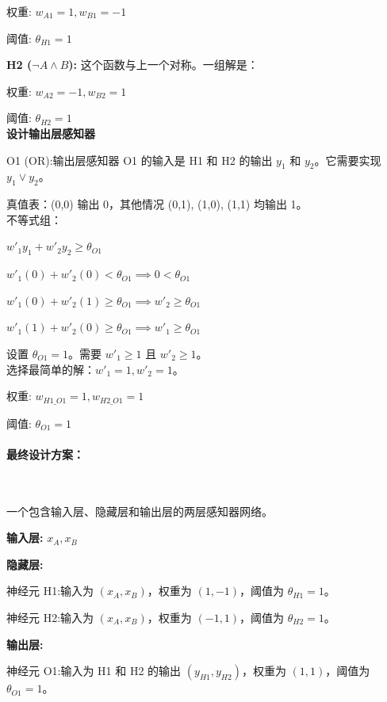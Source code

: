 \documentclass{article}
\begin{document}
        权重: $w_{A1} = 1, w_{B1} = -1$
        
        阈值: $\theta_{H1} = 1$
        
    \textbf{H2 ($\neg A \land B$):} 这个函数与上一个对称。一组解是：
        
        权重: $w_{A2} = -1, w_{B2} = 1$
        
        阈值: $\theta_{H2} = 1$\\
        
    \textbf{设计输出层感知器}
    
    O1 (OR):输出层感知器 O1 的输入是 H1 和 H2 的输出 $y_1$ 和 $y_2$。它需要实现 $y_1 \lor y_2$。
        
    真值表：(0,0) 输出 0，其他情况 (0,1), (1,0), (1,1) 均输出 1。\\

    不等式组：
    
    $w'_1 y_1 + w'_2 y_2 \ge \theta_{O1}$
        
    $w'_1(0) + w'_2(0) < \theta_{O1} \implies 0 < \theta_{O1}$
    
    $w'_1(0) + w'_2(1) \ge \theta_{O1} \implies w'_2 \ge \theta_{O1}$
    
    $w'_1(1) + w'_2(0) \ge \theta_{O1} \implies w'_1 \ge \theta_{O1}$

    设置 $\theta_{O1} = 1$。需要 $w'_1 \ge 1$ 且 $w'_2 \ge 1$。\\
   
    选择最简单的解：$w'_1 = 1, w'_2 = 1$。
        
        权重: $w_{H1\_O1} = 1, w_{H2\_O1} = 1$
        
        阈值: $\theta_{O1} = 1$

    \paragraph{最终设计方案：}~{}
    
    一个包含输入层、隐藏层和输出层的两层感知器网络。
    
    \textbf{输入层:} $x_A, x_B$
    
    \textbf{隐藏层:}
        
        神经元 H1:输入为 $(x_A, x_B)$，权重为 $(1, -1)$，阈值为 $\theta_{H1}=1$。

        神经元 H2:输入为 $(x_A, x_B)$，权重为 $(-1, 1)$，阈值为 $\theta_{H2}=1$。
        
    \textbf{输出层:}
        
        神经元 O1:输入为 H1 和 H2 的输出 $(y_{H1}, y_{H2})$，权重为 $(1, 1)$，阈值为 $\theta_{O1}=1$。\\
    
\end{document}
